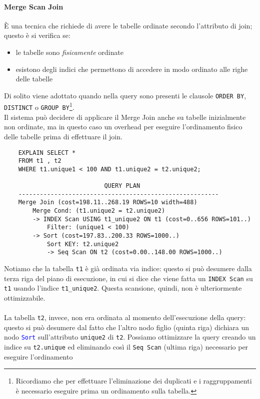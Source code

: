 \documentclass[12pt,a4paper]{book}
\begin{document}
	\paragraph{Merge Scan Join} È una tecnica che richiede di avere le tabelle ordinate secondo l'attributo di join; questo è si verifica se:
	\begin{itemize}
		\item le tabelle sono \textit{fisicamente} ordinate
		\item esistono degli indici che permettono di accedere in modo ordinato alle righe delle tabelle
	\end{itemize}
	Di solito viene adottato quando nella query sono presenti le clausole \texttt{ORDER BY}, \texttt{DISTINCT} o \texttt{GROUP BY}\footnote{Ricordiamo che per effettuare l'eliminazione dei duplicati e i raggruppamenti è necessario eseguire prima un ordinamento sulla tabella.}. \\Il sistema può decidere di applicare il Merge Join anche su tabelle inizialmente non ordinate, ma in questo caso un overhead per eseguire l'ordinamento fisico delle tabelle prima di effettuare il join.
	\begin{tcolorbox}[enhanced jigsaw, breakable, title=Esempio: piano di esecuzione di un Merge Join, title filled]
	\begin{lstlisting}
	EXPLAIN SELECT * 
	FROM t1 , t2
	WHERE t1.unique1 < 100 AND t1.unique2 = t2.unique2;
	
							QUERY PLAN
	--------------------------------------------------------
	Merge Join (cost=198.11..268.19 ROWS=10 width=488)
		Merge Cond: (t1.unique2 = t2.unique2)
		-> INDEX Scan USING t1_unique2 ON t1 (cost=0..656 ROWS=101..)
			Filter: (unique1 < 100)
		-> Sort (cost=197.83..200.33 ROWS=1000..)
			Sort KEY: t2.unique2
			-> Seq Scan ON t2 (cost=0.00..148.00 ROWS=1000..)
	\end{lstlisting}
	Notiamo che la tabella \texttt{t1} è già ordinata via indice: questo si può desumere dalla terza riga del piano di esecuzione, in cui si dice che viene fatta un \texttt{INDEX Scan} su \texttt{t1} usando l'indice \texttt{t1_unique2}. Questa scansione, quindi, non è ulteriormente ottimizzabile.\\\\
	La tabella \texttt{t2}, invece, non era ordinata al momento dell'esecuzione della query: questo si può desumere dal fatto che l'altro nodo figlio (quinta riga) dichiara un nodo \textcolor{blue}{\texttt{Sort}} sull'attributo \texttt{unique2} di \texttt{t2}. Possiamo ottimizzare la query creando un indice su \texttt{t2.unique} ed eliminando così il \texttt{Seq Scan} (ultima riga) necessario per eseguire l'ordinamento
	\end{tcolorbox}
\end{document}
